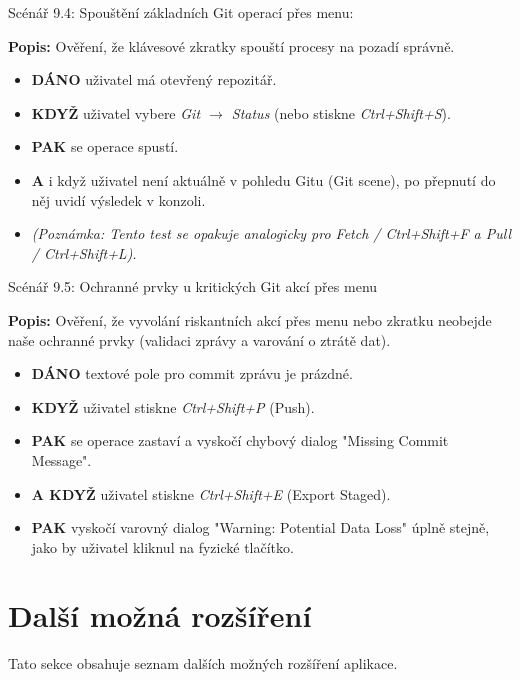 \documentclass[12pt, a4paper]{article}
\begin{document}
Scénář 9.4: Spouštění základních Git operací přes menu:

\textbf{Popis:} Ověření, že klávesové zkratky spouští procesy na pozadí správně.
\begin{itemize}
    \item \textbf{DÁNO} uživatel má otevřený repozitář.
    \item \textbf{KDYŽ} uživatel vybere \textit{Git $\rightarrow$ Status} (nebo stiskne \textit{Ctrl+Shift+S}).
    \item \textbf{PAK} se operace spustí.
    \item \textbf{A} i když uživatel není aktuálně v pohledu Gitu (Git scene), po přepnutí do něj uvidí výsledek v konzoli.
    \item \textit{(Poznámka: Tento test se opakuje analogicky pro Fetch / Ctrl+Shift+F a Pull / Ctrl+Shift+L).}
\end{itemize}

Scénář 9.5: Ochranné prvky u kritických Git akcí přes menu

\textbf{Popis:} Ověření, že vyvolání riskantních akcí přes menu nebo zkratku neobejde naše ochranné prvky (validaci zprávy a varování o ztrátě dat).
\begin{itemize}
    \item \textbf{DÁNO} textové pole pro commit zprávu je prázdné.
    \item \textbf{KDYŽ} uživatel stiskne \textit{Ctrl+Shift+P} (Push).
    \item \textbf{PAK} se operace zastaví a vyskočí chybový dialog "Missing Commit Message".
    \item \textbf{A KDYŽ} uživatel stiskne \textit{Ctrl+Shift+E} (Export Staged).
    \item \textbf{PAK} vyskočí varovný dialog "Warning: Potential Data Loss" úplně stejně, jako by uživatel kliknul na fyzické tlačítko.
\end{itemize}

\section{Další možná rozšíření}

Tato sekce obsahuje seznam dalších možných rozšíření aplikace.
\end{document}
